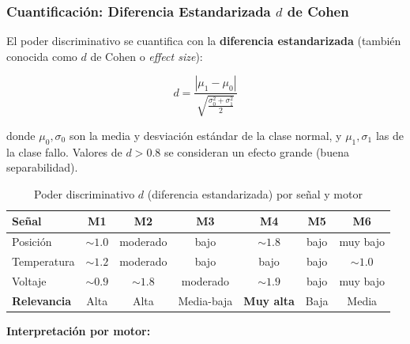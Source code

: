 \documentclass[12pt,a4paper]{article}
\begin{document}
\subsubsection{Cuantificación: Diferencia Estandarizada $d$ de Cohen}

El poder discriminativo se cuantifica con la \textbf{diferencia estandarizada}
(también conocida como $d$ de Cohen o \textit{effect size}):

\begin{equation}
  d = \frac{|\mu_1 - \mu_0|}{\sqrt{\frac{\sigma_0^2 + \sigma_1^2}{2}}}
\end{equation}

donde $\mu_0, \sigma_0$ son la media y desviación estándar de la clase normal,
y $\mu_1, \sigma_1$ las de la clase fallo.
Valores de $d > 0.8$ se consideran un efecto grande (buena separabilidad).

\begin{table}[H]
\centering
\caption{Poder discriminativo $d$ (diferencia estandarizada) por señal y motor}
\begin{tabular}{@{}lcccccc@{}}
\toprule
\textbf{Señal}      & \textbf{M1} & \textbf{M2} & \textbf{M3}
                    & \textbf{M4} & \textbf{M5} & \textbf{M6}\\
\midrule
Posición            & $\sim 1.0$  & moderado    & bajo        & $\sim 1.8$ & bajo       & muy bajo\\
Temperatura         & $\sim 1.2$  & moderado    & bajo        & bajo       & bajo       & $\sim 1.0$\\
Voltaje             & $\sim 0.9$  & $\sim 1.8$  & moderado    & $\sim 1.9$ & bajo       & muy bajo\\
\midrule
\textbf{Relevancia} & Alta        & Alta        & Media-baja  & \textbf{Muy alta} & Baja & Media\\
\bottomrule
\end{tabular}
\end{table}

\textbf{Interpretación por motor:}
\end{document}
